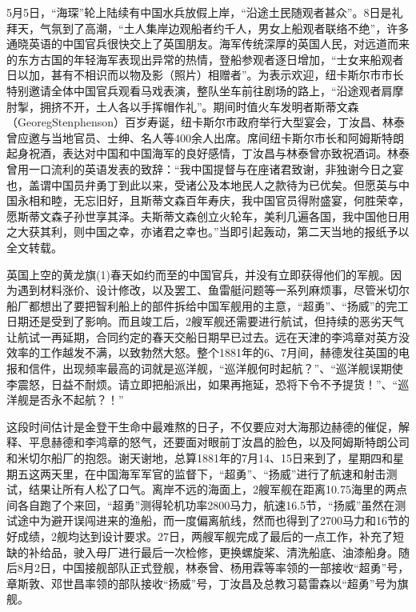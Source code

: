 \documentclass[12pt,UTF8]{ctexbook}
\begin{document}
5月5日，“海琛”轮上陆续有中国水兵放假上岸，“沿途土民随观者甚众”。8日是礼拜天，气氛到了高潮，“土人集岸边观船者约千人，男女上船观者联络不绝”，许多通晓英语的中国官兵很快交上了英国朋友。海军传统深厚的英国人民，对远道而来的东方古国的年轻海军表现出异常的热情，登船参观者逐日增加，“士女来船观者日以加，甚有不相识而以物及影（照片）相赠者”。为表示欢迎，纽卡斯尔市市长特别邀请全体中国官兵观看马戏表演，整队坐车前往剧场的路上，“沿途观者肩摩肘掣，拥挤不开，土人各以手挥帽作礼”。期间时值火车发明者斯蒂文森（GeoregStenphenson）百岁寿诞，纽卡斯尔市政府举行大型宴会，丁汝昌、林泰曾应邀与当地官员、士绅、名人等400余人出席。席间纽卡斯尔市长和阿姆斯特朗起身祝酒，表达对中国和中国海军的良好感情，丁汝昌与林泰曾亦致祝酒词。林泰曾用一口流利的英语发表的致辞：“我中国提督与在座诸君致谢，非独谢今日之宴也，盖谓中国员弁勇丁到此以来，受诸公及本地民人之款待为已优矣。但愿英与中国永相和睦，无忘旧好，且斯蒂文森百年寿庆，我中国官员得附盛宴，何胜荣幸，愿斯蒂文森子孙世享其泽。夫斯蒂文森创立火轮车，美利几遍各国，我中国他日用之大获其利，则中国之幸，亦诸君之幸也。”当即引起轰动，第二天当地的报纸予以全文转载。

英国上空的黄龙旗(1)春天如约而至的中国官兵，并没有立即获得他们的军舰。因为遇到材料涨价、设计修改，以及罢工、鱼雷艇问题等一系列麻烦事，尽管米切尔船厂都想出了要把智利船上的部件拆给中国军舰用的主意，“超勇”、“扬威”的完工日期还是受到了影响。而且竣工后，2艘军舰还需要进行航试，但持续的恶劣天气让航试一再延期，合同约定的春天交船日期早已过去。远在天津的李鸿章对英方没效率的工作越发不满，以致勃然大怒。整个1881年的6、7月间，赫德发往英国的电报和信件，出现频率最高的词就是巡洋舰，“巡洋舰何时起航？”、“巡洋舰误期使李震怒，日益不耐烦。请立即把船派出，如果再拖延，恐将下令不予提货！”、“巡洋舰是否永不起航？！”

这段时间估计是金登干生命中最难熬的日子，不仅要应对大海那边赫德的催促，解释、平息赫德和李鸿章的怒气，还要面对眼前丁汝昌的脸色，以及阿姆斯特朗公司和米切尔船厂的抱怨。谢天谢地，总算1881年的7月14、15日来到了，星期四和星期五这两天里，在中国海军军官的监督下，“超勇”、“扬威”进行了航速和射击测试，结果让所有人松了口气。离岸不远的海面上，2艘军舰在距离10.75海里的两点间各自跑了个来回，“超勇”测得轮机功率2800马力，航速16.5节，“扬威”虽然在测试途中为避开误闯进来的渔船，而一度偏离航线，然而也得到了2700马力和16节的好成绩，2舰均达到设计要求。27日，两艘军舰完成了最后的一点工作，补充了短缺的补给品，驶入母厂进行最后一次检修，更换螺旋桨、清洗船底、油漆船身。随后8月2日，中国接舰部队正式登舰，林泰曾、杨用霖等率领的一部接收“超勇”号，章斯敦、邓世昌率领的部队接收“扬威”号，丁汝昌及总教习葛雷森以“超勇”号为旗舰。
\end{document}
